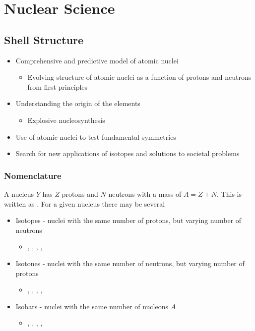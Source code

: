 \section{Nuclear Science}
\subsection{Shell Structure}
\begin{itemize}
	\item Comprehensive and predictive model of atomic nuclei
	\begin{itemize}
		\item Evolving structure of atomic nuclei as a function of protons and neutrons from first principles
	\end{itemize}
	\item Understanding the origin of the elements
	\begin{itemize}
		\item Explosive nucleosynthesis
	\end{itemize}
	\item Use of atomic nuclei to test fundamental symmetries
	\item Search for new applications of isotopes and solutions to societal problems
\end{itemize}

\subsubsection{Nomenclature}
A nucleus $Y$ has $Z$ protons and $N$ neutrons with a mass of $A = Z + N$.
This is written as . For a given nucleus there may be several
\begin{itemize}
	\item Isotopes - nuclei with the same number of protons, but varying number of neutrons
	\begin{itemize}
		\item {}, , , , 
	\end{itemize}
	\item Isotones - nuclei with the same number of neutrons, but varying number of protons
	\begin{itemize}
		\item {}, , , , 
	\end{itemize}
	\item Isobars - nuclei with the same number of nucleons $A$
	\begin{itemize}
		\item {}, , , , 
	\end{itemize}
\end{itemize}